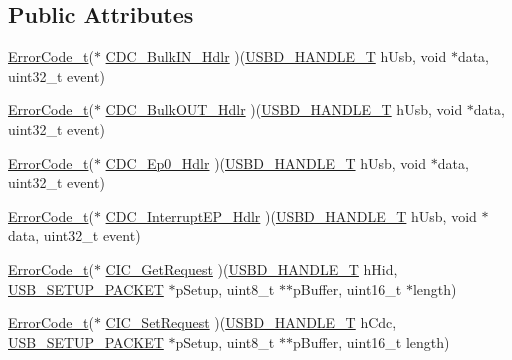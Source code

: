 \subsection*{Public Attributes}
\begin{DoxyCompactItemize}
\item 
\hyperlink{error_8h_a905255056c349318139d94aa4523d516}{Error\+Code\+\_\+t}($\ast$ \hyperlink{structUSBD__CDC__INIT__PARAM_ac6a85d108817d7ba7e56934df8c80b81}{C\+D\+C\+\_\+\+Bulk\+I\+N\+\_\+\+Hdlr} )(\hyperlink{group__USBD__Core_gafdbb2204d929cb9d75736bd2b42342ac}{U\+S\+B\+D\+\_\+\+H\+A\+N\+D\+L\+E\+\_\+T} h\+Usb, void $\ast$data, uint32\+\_\+t event)
\item 
\hyperlink{error_8h_a905255056c349318139d94aa4523d516}{Error\+Code\+\_\+t}($\ast$ \hyperlink{structUSBD__CDC__INIT__PARAM_a655ea6e4382a762a37073972e84206f3}{C\+D\+C\+\_\+\+Bulk\+O\+U\+T\+\_\+\+Hdlr} )(\hyperlink{group__USBD__Core_gafdbb2204d929cb9d75736bd2b42342ac}{U\+S\+B\+D\+\_\+\+H\+A\+N\+D\+L\+E\+\_\+T} h\+Usb, void $\ast$data, uint32\+\_\+t event)
\item 
\hyperlink{error_8h_a905255056c349318139d94aa4523d516}{Error\+Code\+\_\+t}($\ast$ \hyperlink{structUSBD__CDC__INIT__PARAM_aa537c123e85c8e402a24fd593ca1d4d7}{C\+D\+C\+\_\+\+Ep0\+\_\+\+Hdlr} )(\hyperlink{group__USBD__Core_gafdbb2204d929cb9d75736bd2b42342ac}{U\+S\+B\+D\+\_\+\+H\+A\+N\+D\+L\+E\+\_\+T} h\+Usb, void $\ast$data, uint32\+\_\+t event)
\item 
\hyperlink{error_8h_a905255056c349318139d94aa4523d516}{Error\+Code\+\_\+t}($\ast$ \hyperlink{structUSBD__CDC__INIT__PARAM_ada9ad64d565d5ca5ebb6bc0636b9882e}{C\+D\+C\+\_\+\+Interrupt\+E\+P\+\_\+\+Hdlr} )(\hyperlink{group__USBD__Core_gafdbb2204d929cb9d75736bd2b42342ac}{U\+S\+B\+D\+\_\+\+H\+A\+N\+D\+L\+E\+\_\+T} h\+Usb, void $\ast$data, uint32\+\_\+t event)
\item 
\hyperlink{error_8h_a905255056c349318139d94aa4523d516}{Error\+Code\+\_\+t}($\ast$ \hyperlink{structUSBD__CDC__INIT__PARAM_a7393ec7442baaa058bed1384a9fc6fa6}{C\+I\+C\+\_\+\+Get\+Request} )(\hyperlink{group__USBD__Core_gafdbb2204d929cb9d75736bd2b42342ac}{U\+S\+B\+D\+\_\+\+H\+A\+N\+D\+L\+E\+\_\+T} h\+Hid, \hyperlink{group__USBD__Core_ga4a940f7627cc7e9f0bb693cc0fce8637}{U\+S\+B\+\_\+\+S\+E\+T\+U\+P\+\_\+\+P\+A\+C\+K\+ET} $\ast$p\+Setup, uint8\+\_\+t $\ast$$\ast$p\+Buffer, uint16\+\_\+t $\ast$length)
\item 
\hyperlink{error_8h_a905255056c349318139d94aa4523d516}{Error\+Code\+\_\+t}($\ast$ \hyperlink{structUSBD__CDC__INIT__PARAM_a828e304674e2d4d7c449b9ac7025cb5d}{C\+I\+C\+\_\+\+Set\+Request} )(\hyperlink{group__USBD__Core_gafdbb2204d929cb9d75736bd2b42342ac}{U\+S\+B\+D\+\_\+\+H\+A\+N\+D\+L\+E\+\_\+T} h\+Cdc, \hyperlink{group__USBD__Core_ga4a940f7627cc7e9f0bb693cc0fce8637}{U\+S\+B\+\_\+\+S\+E\+T\+U\+P\+\_\+\+P\+A\+C\+K\+ET} $\ast$p\+Setup, uint8\+\_\+t $\ast$$\ast$p\+Buffer, uint16\+\_\+t length)

\end{DoxyCompactItemize}
